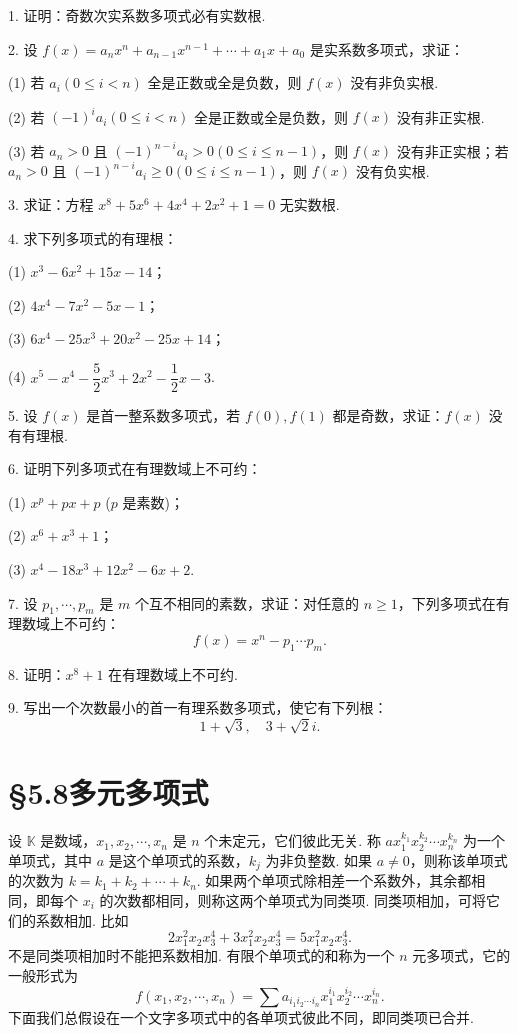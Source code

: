 \documentclass[UTF8, 12pt, fontset=fandol, oneside]{ctexart}
\begin{document}
1. 证明：奇数次实系数多项式必有实数根.

2. 设 $f(x)=a_nx^n+a_{n-1}x^{n-1}+\cdots+a_1x+a_0$ 是实系数多项式，求证：

(1) 若 $a_i(0\leq i<n)$ 全是正数或全是负数，则 $f(x)$ 没有非负实根.

(2) 若 $(-1)^ia_i(0\leq i<n)$ 全是正数或全是负数，则 $f(x)$ 没有非正实根.

(3) 若 $a_n>0$ 且 $(-1)^{n-i}a_i>0(0\leq i\leq n-1)$，则 $f(x)$ 没有非正实根；若 $a_n>0$ 且 $(-1)^{n-i}a_i\geq 0(0\leq i\leq n-1)$，则 $f(x)$ 没有负实根.

3. 求证：方程 $x^8+5x^6+4x^4+2x^2+1=0$ 无实数根.

4. 求下列多项式的有理根：

(1) $x^3-6x^2+15x-14$；

(2) $4x^4-7x^2-5x-1$；

(3) $6x^4-25x^3+20x^2-25x+14$；

(4) $x^5-x^4-\dfrac52x^3+2x^2-\dfrac12x-3$.

5. 设 $f(x)$ 是首一整系数多项式，若 $f(0),f(1)$ 都是奇数，求证：$f(x)$ 没有有理根.

6. 证明下列多项式在有理数域上不可约：

(1) $x^p+px+p$ ($p$ 是素数)；

(2) $x^6+x^3+1$；

(3) $x^4-18x^3+12x^2-6x+2$.

7. 设 $p_1,\cdots,p_m$ 是 $m$ 个互不相同的素数，求证：对任意的 $n\geq 1$，下列多项式在有理数域上不可约：
\[
f(x)=x^n-p_1\cdots p_m.
\]

8. 证明：$x^8+1$ 在有理数域上不可约.

9. 写出一个次数最小的首一有理系数多项式，使它有下列根：
\[
1+\sqrt3,\quad 3+\sqrt{2}i.
\]

\section*{§5.8\quad 多元多项式}

设 $\mathbb{K}$ 是数域，$x_1,x_2,\cdots,x_n$ 是 $n$ 个未定元，它们彼此无关. 称 $ax_1^{k_1}x_2^{k_2}\cdots x_n^{k_n}$ 为一个单项式，其中 $a$ 是这个单项式的系数，$k_j$ 为非负整数. 如果 $a\neq 0$，则称该单项式的次数为 $k=k_1+k_2+\cdots+k_n$. 如果两个单项式除相差一个系数外，其余都相同，即每个 $x_i$ 的次数都相同，则称这两个单项式为同类项. 同类项相加，可将它们的系数相加. 比如
\[
2x_1^2x_2x_3^4+3x_1^2x_2x_3^4=5x_1^2x_2x_3^4.
\]
不是同类项相加时不能把系数相加. 有限个单项式的和称为一个 $n$ 元多项式，它的一般形式为
\[
f(x_1,x_2,\cdots,x_n)=\sum a_{i_1i_2\cdots i_n}x_1^{i_1}x_2^{i_2}\cdots x_n^{i_n}.
\]
下面我们总假设在一个文字多项式中的各单项式彼此不同，即同类项已合并.
\end{document}
